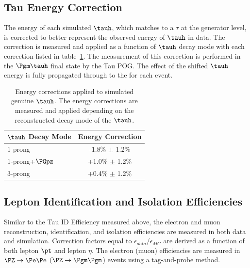 \subsection{Tau Energy Correction}
\label{sec:htt_tec}
The energy of each simulated $\tauh$, which matches to a $\tau$ at the generator level, is corrected
to better represent the observed energy of $\tauh$ in data. The correction is measured and applied
as a function of $\tauh$ decay mode with each correction listed in table~\ref{tab:htt_tec}. The measurement
of this correction is performed in the $\Pgm\tauh$ final state by the Tau POG. The effect of
the shifted $\tauh$ energy is fully propagated through to the \etvecmiss for each event.

\begin{table}[htbp]
\centering
\begin{tabular}{|l|c|}
\hline
$\tauh$ Decay Mode   &   Energy Correction   \\
\hline
1-prong            &   -1.8\%  $\pm$ 1.2\%  \\
1-prong+$\PGpz$    &   +1.0\%  $\pm$ 1.2\%  \\
3-prong            &   +0.4\%  $\pm$ 1.2\%  \\  
\hline
\end{tabular}
\label{tab:htt_tec}
\caption{
Energy corrections applied to simulated genuine $\tauh$. The energy corrections are measured
and applied depending on the reconstructed decay mode of the $\tauh$.
}
\end{table}



\subsection{Lepton Identification and Isolation Efficiencies}
Similar to the Tau ID Efficiency measured above, the electron and muon reconstruction, identification,
and isolation efficiencies are measured in both data and simulation. Correction factors equal to
$\epsilon_{data}/\epsilon_{MC}$ are derived as a function of both lepton $\pt$ and lepton $\eta$.
The electron (muon) efficiencies are measured in $\PZ\to\Pe\Pe$ ($\PZ\to\Pgm\Pgm$) events using a tag-and-probe
method.


